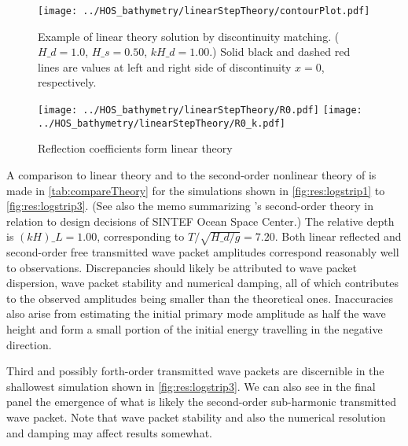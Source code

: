 \begin{figure}[H]%
\centering
\texttt{[image: ../HOS\_bathymetry/linearStepTheory/contourPlot.pdf]}%
\caption{Example of linear theory solution by discontinuity matching. ($H\_d = 1.0$, $H\_s = 0.50$, $kH\_d = 1.00$.) Solid black and dashed red lines are values at left and right side of discontinuity $x=0$, respectively.}%
\label{fig:linearReflection:contour}%
\end{figure}

\begin{figure}[H]%
\centering
\texttt{[image: ../HOS\_bathymetry/linearStepTheory/R0.pdf]}%
\texttt{[image: ../HOS\_bathymetry/linearStepTheory/R0\_k.pdf]}%
\caption{Reflection coefficients form linear theory}%
\label{fig:linearReflection:R0}%
\end{figure}



A comparison to linear theory and to the second-order nonlinear theory of \citet{li_2021_step1} is made in \autoref{tab:compareTheory} for the simulations shown in \autoref{fig:res:logstrip1} to \ref{fig:res:logstrip3}.
(See also the memo \citet{AHA_2021_LiTheory} summarizing \citeauthor{li_2021_step1}'s second-order theory in relation to design decisions of SINTEF Ocean Space Center.)
The relative depth is $(kH)\_L=1.00$,  corresponding to $T/\sqrt{H\_d/g}=7.20$.
Both linear reflected and second-order free transmitted wave packet amplitudes correspond reasonably well to observations.
Discrepancies should likely be attributed to wave packet dispersion, wave packet stability and numerical damping, all of which contributes to the observed amplitudes being smaller than the theoretical ones.
Inaccuracies also arise from estimating the initial primary mode amplitude as half the wave height and form a small portion of the initial energy travelling in the negative direction.

Third and possibly forth-order transmitted wave packets are discernible in the shallowest simulation shown in \autoref{fig:res:logstrip3}.
We can also see in the final panel the emergence of what is likely the second-order sub-harmonic transmitted wave packet. 
Note that wave packet stability and also the numerical resolution and damping may affect results somewhat. 
\\


